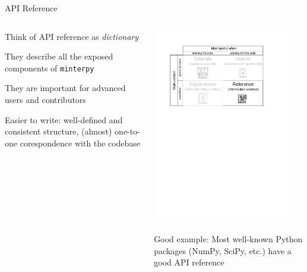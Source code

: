 \documentclass[english,aspectratio=169]{beamer}
\let\tempone\itemize
\let\temptwo\enditemize
\renewenvironment{itemize}{\tempone\addtolength{\itemsep}{0.35\baselineskip}}{\temptwo}
\begin{document}
\begin{frame}{API Reference}
\footnotesize

\begin{columns}[onlytextwidth]

\begin{column}{0.5\textwidth}

\begin{itemize}
    \item Think of API reference as \emph{dictionary}
    \item They describe all the exposed components of \texttt{minterpy}
    \item They are important for advanced users and contributors
    \item Easier to write: well-defined and consistent structure,
          (almost) one-to-one corespondence with the codebase
\end{itemize}

\end{column}

\begin{column}{0.5\textwidth}
    \begin{center}
    \includegraphics[width=0.9\textwidth]{./figures/documentation-system-reference}
    \end{center}
    \begin{exampleblock}{}
        \centering
        Good example: Most well-known Python packages (NumPy, SciPy, etc.) have a good API reference
    \end{exampleblock}
\end{column}


\end{columns}
\end{frame}
\end{document}

